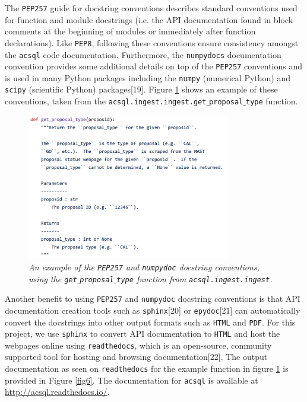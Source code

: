 \documentclass[10pt,journal,compsoc]{IEEEtran}
\begin{document}
The \texttt{PEP257} guide for docstring conventions describes standard conventions used for function and module docstrings (i.e. the API documentation found in block comments at the
beginning of modules or immediately after function declarations).  Like \texttt{PEP8}, following these conventions ensure consistency amongst the \texttt{acsql} code documentation.
Furthermore, the \texttt{numpydocs} documentation convention provides some additional details on top of the \texttt{PEP257} conventions and is used in many Python packages including
the \texttt{numpy} (numerical Python) and \texttt{scipy} (scientific Python) packages[19].  Figure \ref{fig5} shows an example of these conventions, taken from the
\texttt{acsql.ingest.ingest.get$\_$proposal$\_$type} function.

\begin{figure}[!b]
\centering
\includegraphics[width=3.5in]{./figures/docstrings.png}
\caption{\textit{An example of the \texttt{PEP257} and \texttt{numpydoc} docstring conventions, using the \texttt{get$\_$proposal$\_$type} function from \texttt{acsql.ingest.ingest}.}}
\label{fig5}
\end{figure}

Another benefit to using \texttt{PEP257} and \texttt{numpydoc} docstring conventions is that API documentation creation tools such as \texttt{sphinx}[20] or \texttt{epydoc}[21] can
automatically convert the docstrings into other output formats such as \texttt{HTML} and \texttt{PDF}.  For this project, we use \texttt{sphinx} to convert API documentation to \texttt{HTML}
and host the webpages online using \texttt{readthedocs}, which is an open-source, community supported tool for hosting and browsing documentation[22]. The output documentation as seen on
\texttt{readthedocs} for the example function in figure \ref{fig5} is provided in Figure \ref{fig6}. The documentation for \texttt{acsql} is available at
\textcolor{blue}{\url{http://acsql.readthedocs.io/}}.
\end{document}
